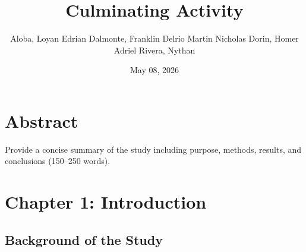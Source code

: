 \documentclass[
]{article}
\title{Culminating Activity}
\author{Aloba, Loyan Edrian \textbar{} Dalmonte, Franklin \textbar{}
Delrio Martin Nicholas \textbar{} Dorin, Homer Adriel \textbar{} Rivera,
Nythan}
\date{May 08, 2026}
\begin{document}
\maketitle

\section{Abstract}\label{abstract}

Provide a concise summary of the study including purpose, methods,
results, and conclusions (150--250 words).

\section{Chapter 1: Introduction}\label{chapter-1-introduction}

\subsection{Background of the Study}\label{background-of-the-study}
\end{document}
